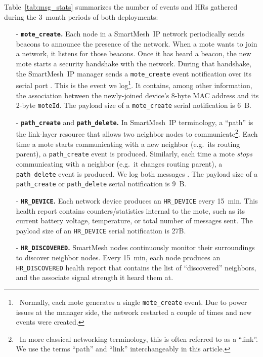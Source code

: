 \documentclass{elsarticle}
\newcommand{\sm}                  {SmartMesh\xspace}
\newcommand{\smip}                {SmartMesh~IP\xspace}
\newcommand{\HRDISCOVERED}        {{\tt HR\_DISCOVERED}\xspace}
\newcommand{\HRDEVICE}            {{\tt HR\_DEVICE}\xspace}
\newcommand{\pathcreate}          {{\tt path\_create}\xspace}
\newcommand{\pathdelete}          {{\tt path\_delete}\xspace}
\newcommand{\motecreate}          {{\tt mote\_create}\xspace}
\newcommand{\moteId}              {{\tt moteId}\xspace}
\begin{document}
Table~\ref{tab:msg_stats} summarizes the number of events and HRs gathered during the 3~month periods of both deployments:

\begin{itemize}
    \item[-] \textbf{\motecreate.}
        Each node in a \smip network periodically sends beacons to announce the presence of the network.
        When a mote wants to join a network, it listens for those beacons.
        Once it has heard a beacon, the new mote starts a security handshake with the network.
        During that handshake, the \smip manager sends a \motecreate event notification over its serial port \cite{smip_manager_api}.
        This is the event we log\footnote{~Normally, each mote generates a single \motecreate event. Due to power issues at the manager side, the network restarted a couple of times and new events were created.}.
        It contains, among other information, the association between the newly-joined device's 8-byte MAC address and its 2-byte \moteId.
        The payload size of a \motecreate serial notification is 6~B.
    \item[-] \textbf{\pathcreate} and \textbf{\pathdelete.}
        In \smip terminology, a ``path'' is the link-layer resource that allows two neighbor nodes to communicate\footnote{~In more classical networking terminology, this is often referred to as a ``link''. We use the terms ``path'' and ``link'' interchangeably in this article.}.
        Each time a mote starts communicating with a new neighbor (e.g.~its routing parent), a \pathcreate event is produced.
        Similarly, each time a mote \textit{stops} communicating with a neighbor (e.g.~it changes routing parent), a \pathdelete event is produced.
        We log both messages \cite{smip_manager_api}.
        The payload size of a \pathcreate or \pathdelete serial notification is 9~B.
    \item[-] \textbf{\HRDEVICE.}
        Each network device produces an \HRDEVICE every 15~min.
        This health report contains counters/statistics internal to the mote, such as its current battery voltage, temperature, or total number of messages sent.
        The payload size of an \HRDEVICE serial notification is 27B.
    \item[-] \textbf{\HRDISCOVERED.}
        \sm nodes continuously monitor their surroundings to discover neighbor nodes.
        Every 15~min, each node produces an \HRDISCOVERED health report that contains the list of ``discovered'' neighbors, and the associate signal strength it heard them at.

\end{itemize}
\end{document}
